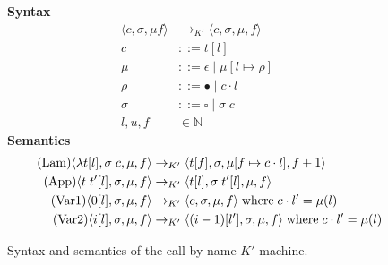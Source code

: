 \begin{figure*}
\textbf{Syntax}
\begin{align*}
\langle c, \sigma, \mu f \rangle &\rightarrow_{K'} \langle c, \sigma, \mu, f \rangle \\
\tag{Closure} c &::= t [l] \\
\tag{Heap} \mu &::= \epsilon \; | \; \mu [ l \mapsto \rho ] \\
\tag{Environment} \rho &::= \bullet \; | \; c \cdot l \\
\tag{Context} \sigma &::= \square \; | \; \sigma \; c \\
\tag{Location} l,u,f &\in \mathbb{N}
\end{align*}
\textbf{Semantics}
\begin{align*}
\tag{Lam}
\langle \lambda t[l], \sigma \; c, \mu, f \rangle 
  &\rightarrow_{K'}
\langle t[f], \sigma, \mu[f \mapsto c \cdot l], f+1 \rangle  \\
\tag{App}
\langle t \; t'[l], \sigma, \mu, f \rangle
  &\rightarrow_{K'}
\langle t[l], \sigma \; t'[l], \mu, f \rangle \\
\tag{Var1}
\langle 0[l], \sigma, \mu, f \rangle
  &\rightarrow_{K'}
\langle c, \sigma, \mu, f \rangle 
\; \textnormal{where} \; c \cdot l' = \mu(l)\\
\tag{Var2}
\langle i[l], \sigma, \mu, f \rangle
  &\rightarrow_{K'}
\langle (i-1)[l'], \sigma, \mu, f \rangle
\; \textnormal{where} \; c \cdot l' = \mu(l) \\
\end{align*}
\caption{Syntax and semantics of the call-by-name $K'$ machine.}
\label{fig:K'}
\end{figure*}
